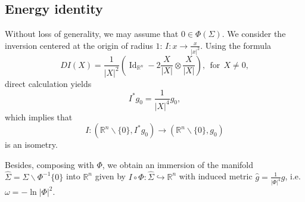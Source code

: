\documentclass[11pt,letterpaper]{amsart}
\DeclareMathOperator{\Id}{Id}
\newcommand{\bR}{\mathbb{R}}
\theoremstyle{definition}
\theoremstyle{remark}
\numberwithin{equation}{section}
\begin{document}
\subsection{Energy identity}
Without loss of generality, we may assume that $0\in \Phi(\Sigma)$. We consider the inversion centered at the origin of radius $1$: $I: x\to \frac{x}{|x|^2}$. Using the formula
\begin{equation*}
    DI(X)=\frac{1}{|X|^2}\left(\Id_{\bR^n}-2\frac{X}{|X|}\otimes \frac{X}{|X|}\right), ~~\mbox{for}~~ X\neq 0,
\end{equation*}
direct calculation yields
\begin{equation*}
    I^{*}g_0=\frac{1}{|X|^4}g_0,
\end{equation*}
which implies that
\begin{equation*}
    I: (\bR^n\backslash \{0\}, I^{*}g_0)\to (\bR^n\backslash \{0\}, g_0)
\end{equation*}
is an isometry.

Besides, composing with $\Phi$, we obtain an immersion of the manifold $\hat{\Sigma}=\Sigma\backslash \Phi^{-1}\{0\}$ into $\bR^n$ given by $I\circ \Phi: \hat{\Sigma}\hookrightarrow \bR^n$ with induced metric $\hat{g}=\frac{1}{|\Phi|^4}g$, i.e. $\omega=-\ln |\Phi|^2$. 
\end{document}
